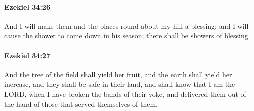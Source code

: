 		\paragraph{Ezekiel 34:26} %
			\label{EZEKIEL-34-26}

			And I will make them and the places round about my hill a blessing; and I will cause the shower to come down in his season; there shall be showers of blessing.


		\paragraph{Ezekiel 34:27} %
			\label{EZEKIEL-34-27}

			And the tree of the field shall yield her fruit, and the earth shall yield her increase, and they shall be safe in their land, and shall know that I am the LORD, when I have broken the bands of their yoke, and delivered them out of the hand of those that served themselves of them.

